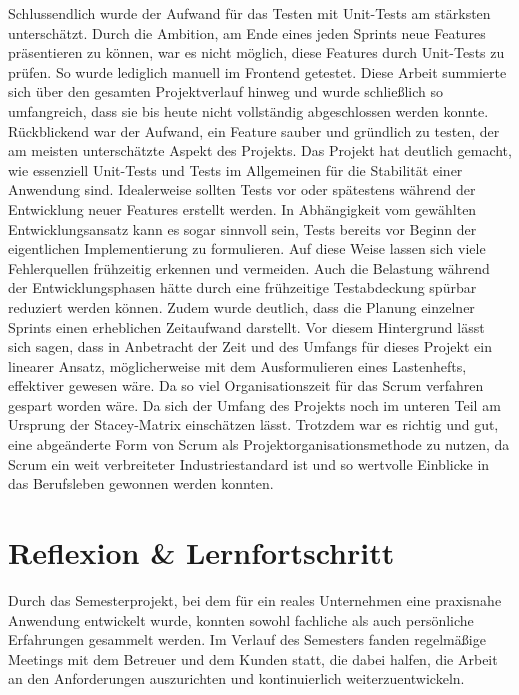 \documentclass[a4paper,12pt]{article}
\begin{document}
Schlussendlich wurde der Aufwand für das Testen mit Unit-Tests am stärksten unterschätzt. Durch die Ambition, am Ende eines jeden Sprints neue Features präsentieren zu können, war es nicht möglich, diese Features durch Unit-Tests zu prüfen. So wurde lediglich manuell im Frontend getestet. Diese Arbeit summierte sich über den gesamten Projektverlauf hinweg und wurde schließlich so umfangreich, dass sie bis heute nicht vollständig abgeschlossen werden konnte. Rückblickend war der Aufwand, ein Feature sauber und gründlich zu testen, der am meisten unterschätzte Aspekt des Projekts. Das Projekt hat deutlich gemacht, wie essenziell Unit-Tests und Tests im Allgemeinen für die Stabilität einer Anwendung sind. Idealerweise sollten Tests vor oder spätestens während der Entwicklung neuer Features erstellt werden. In Abhängigkeit vom gewählten Entwicklungsansatz kann es sogar sinnvoll sein, Tests bereits vor Beginn der eigentlichen Implementierung zu formulieren. Auf diese Weise lassen sich viele Fehlerquellen frühzeitig erkennen und vermeiden. Auch die Belastung während der Entwicklungsphasen hätte durch eine frühzeitige Testabdeckung spürbar reduziert werden können. Zudem wurde deutlich, dass die Planung einzelner Sprints einen erheblichen Zeitaufwand darstellt. Vor diesem Hintergrund lässt sich sagen, dass in Anbetracht der Zeit und des Umfangs für dieses Projekt ein linearer Ansatz, möglicherweise mit dem Ausformulieren eines Lastenhefts, effektiver gewesen wäre. Da so viel Organisationszeit für das Scrum verfahren gespart worden wäre. Da sich der Umfang des Projekts noch im unteren Teil am Ursprung der Stacey-Matrix einschätzen lässt. Trotzdem war es richtig und gut, eine abgeänderte Form von Scrum als Projektorganisationsmethode zu nutzen, da Scrum ein weit verbreiteter Industriestandard ist und so wertvolle Einblicke in das Berufsleben gewonnen werden konnten.

\newpage


\section{Reflexion \& Lernfortschritt}

Durch das Semesterprojekt, bei dem für ein reales Unternehmen eine praxisnahe Anwendung entwickelt wurde, konnten sowohl fachliche als auch persönliche Erfahrungen gesammelt werden. Im Verlauf des Semesters fanden regelmäßige Meetings mit dem Betreuer und dem Kunden statt, die dabei halfen, die Arbeit an den Anforderungen auszurichten und kontinuierlich weiterzuentwickeln.
\end{document}
